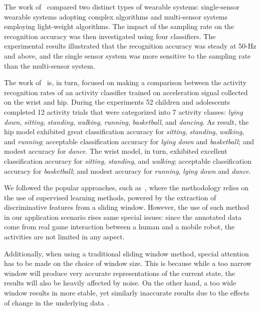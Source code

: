 The work of~\cite{gao_evaluation_2014} compared two distinct types of wearable systems: single-sensor wearable systems adopting complex algorithms and multi-sensor systems employing light-weight algorithms. The impact of the sampling rate on the recognition accuracy was then investigated using four classifiers. The experimental results illustrated that the recognition accuracy was steady at 50-Hz and above, and the single sensor system was more sensitive to the sampling rate than the multi-sensor system.

The work of~\cite{trost_machine_2014} is, in turn, focused on making a comparison between the activity recognition rates of an activity classifier trained on acceleration signal collected on the wrist and hip. During the experiments 52 children and adolescents completed 12 activity trials that were categorized into 7 activity classes: \textit{lying down}, \textit{sitting}, \textit{standing}, \textit{walking}, \textit{running}, \textit{basketball}, and \textit{dancing}. As result, the hip model exhibited great classification accuracy for \textit{sitting}, \textit{standing}, \textit{walking}, and \textit{running}; acceptable classification accuracy for \textit{lying down} and \textit{basketball}; and modest accuracy for \textit{dance}. The wrist model, in turn, exhibited excellent classification accuracy for \textit{sitting}, \textit{standing}, and \textit{walking}; acceptable classification accuracy for \textit{basketball}; and modest accuracy for \textit{running}, \textit{lying down} and \textit{dance}.

We followed the popular approaches, such as~\cite{ravi_activity_2005, bao_activity_2004}, where the methodology relies on the use of supervised learning methods, powered by the extraction of discriminative features from a sliding window. However, the use of such method in our application scenario rises same special issues: since the annotated data come from real game interaction between a human and a mobile robot, the activities are not limited in any aspect.

Additionally, when using a traditional sliding window method, special attention has to be made on the choice of window size. This is because while a too narrow window will produce very accurate representations of the current state, the results will also be heavily affected by noise. On the other hand, a too wide window results in more stable, yet similarly inaccurate results due to the effects of change in the underlying data~\cite{bifet_learning_2007}. 

